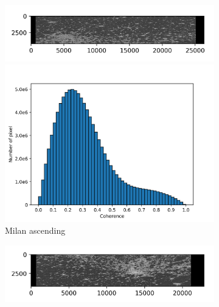 \documentclass[preprint, authoryear]{elsarticle}
\begin{document}
\begin{figure}
\begin{subfigure}{0.5\textwidth}
        \caption*{}
    \end{subfigure}%
    \hfill
    \begin{subfigure}{0.5\textwidth}
        \centering
        \begin{minipage}{0.5\textwidth}
            \centering
            \includegraphics[width=\textwidth]{figure/The coherence/coh_Milan_asc_esd1.png}
        \end{minipage}%
        \begin{minipage}{0.5\textwidth}
            \centering
            \includegraphics[width=\textwidth]{figure/The coherence/coh_Milan_asc_esd1_histogram_.png}
        \end{minipage}
        \caption{Milan ascending}
        \label{fig_6f}
    \end{subfigure}%
    \begin{subfigure}{0.5\textwidth}
        \centering
        \begin{minipage}{0.5\textwidth}
            \centering
            \includegraphics[width=\textwidth]{figure/The coherence/coh_Milan_des_esd1.png}

\end{minipage}
\end{subfigure}
\end{figure}
\end{document}
